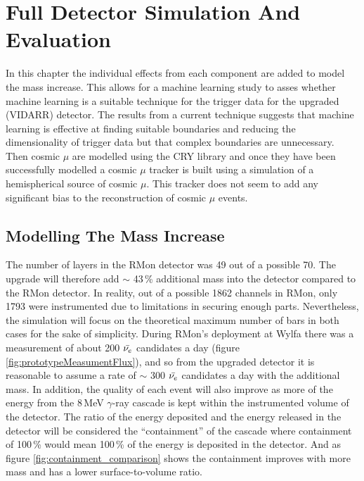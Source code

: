 
\chapter{Full Detector Simulation And Evaluation}\label{chp:DataAnalysisTechniques}

In this chapter the individual effects from each component are added to model the mass increase. This allows for a machine learning study to asses whether machine learning is a suitable technique for the trigger data for the upgraded (VIDARR) detector. The results from a current technique suggests that machine learning is effective at finding suitable boundaries and reducing the dimensionality of trigger data but that complex boundaries are unnecessary. Then cosmic $\mu$ are modelled using the CRY library \cite{ieee_cry_2007} and once they have been successfully modelled a cosmic $\mu$ tracker is built using a simulation of a hemispherical source of cosmic $\mu$. This tracker does not seem to add any significant bias to the reconstruction of cosmic $\mu$ events.

\section{Modelling The Mass Increase}
The number of layers in the RMon detector was 49 out of a possible 70. The upgrade will therefore add $\sim$ 43\,\% additional mass into the detector compared to the RMon detector. In reality, out of a possible 1862 channels in RMon, only 1793 were instrumented due to limitations in securing enough parts. Nevertheless, the simulation will focus on the theoretical maximum number of bars in both cases for the sake of simplicity. During RMon's deployment at Wylfa there was a measurement of about 200 $\Bar{\nu_e}$ candidates a day \cite{Carroll_2018} (figure \ref{fig:prototypeMeasumentFlux}), and so from the upgraded detector it is reasonable to assume a rate of $\sim$ 300 $\Bar{\nu_e}$ candidates a day with the additional mass. In addition, the quality of each event will also improve as more of the energy from the 8\,MeV $\gamma$-ray cascade is kept within the instrumented volume of the detector. The ratio of the energy deposited and the energy released in the detector will be considered the ``containment'' of the cascade where containment of 100\,\% would mean 100\,\% of the energy is deposited in the detector. And as figure \ref{fig:containment_comparison} shows the containment improves with more mass and has a lower surface-to-volume ratio. %

